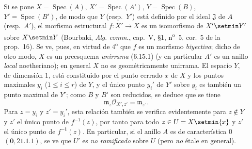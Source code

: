 \begin{env}[21.13.9]
Si se pone $X=\operatorname{Spec}(A)$, $X'=\operatorname{Spec}(A')$,
$Y=\operatorname{Spec}(B)$, $Y'=\operatorname{Spec}(B')$, de modo que $Y$
(resp.\ $Y'$) está definido por el ideal $\mathfrak J$ de $A$ (resp.\ $A'$), el morfismo
estructural $f:X'\to X$ es un isomorfismo de $X'\setmin Y'$ sobre $X\setmin Y$ (Bourbaki,
\emph{Alg. comm.}, cap.~V, \S1, n\textsuperscript{o}~5, cor.~5 de la prop.~16). Se
ve, pues, en virtud de $4^{\mathrm o}$ que $f$ es un morfismo \emph{biyectivo}; dicho
de otro modo, $X$ es un preesquema \emph{unirrama} (6.15.1) (y en particular
$A'$ es un anillo \emph{local} noetheriano); en general $X$ no es geométricamente
unirrama. El espacio $Y$, de dimensión $1$, está constituido por el punto cerrado $x$ de
$X$ y los puntos maximales $y_i$ ($1\leq i\leq r$) de $Y$, y el único punto $y_i'$
de $Y'$ sobre $y_i$ es también un punto maximal de $Y'$; como $B$ y $B'$ son
reducidos, se deduce que se tiene
\[
  \mathfrak m_z\mathcal O_{X',z'}=\mathfrak m_{z'}.
\]
Para $z=y_i$ y $z'=y_i'$, esta relación también se verifica evidentemente para
$z\notin Y$ y $z'$ el único punto de $f^{-1}(z)$, por tanto para todo
$z\in U=X\setmin\{x\}$ y $z'$ el único punto de $f^{-1}(z)$. En particular, si el anillo
$A$ es de característica $0$ $(\mathbf 0, 21.1.1)$, se ve que $U'$ es \emph{no ramificado} sobre
$U$ (pero \emph{no} étale en general).


\end{env}
